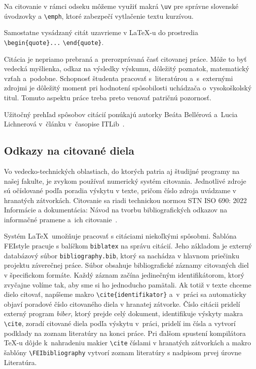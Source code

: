 Na citovanie v rámci odseku môžeme využiť makrá \verb|\uv| pre
správne slovenské úvodzovky a \verb|\emph|,
ktoré zabezpečí vytlačenie textu kurzívou.

Samostatne vysádzaný citát uzavrieme v \LaTeX-u do prostredia
\verb|\begin{quote}...| \verb|\end{quote}|.

Citácia je nepriamo prebraná a~prerozprávaná
časť citovanej práce.
Môže to byť vedecká myšlienka, odkaz na výsledky výskumu,
dôležitý poznatok, matematický vzťah a~podobne.
Schopnosť študenta pracovať s~literatúrou a~s~externými zdrojmi
je dôležitý moment pri hodnotení spôsobilosti uchádzača
o~vysokoškolský titul.
Tomuto aspektu práce treba preto venovať patričnú pozornosť.

Užitočný prehľad spôsobov citácií ponúkajú autorky
Beáta Bellérová a~Lucia Lichnerová v~článku v~časopise ITLib~\cite{Lichnerova2023Nove}.

\subsection{Odkazy na citované diela}
Vo vedecko-technických oblastiach, do ktorých patria aj študijné programy na našej fakulte, je zvykom používať numerický systém citovania. Jednotlivé zdroje sú očíslované podľa poradia výskytu v texte, pričom číslo zdroja uvádzame v hranatých zátvorkách.
Citovanie sa riadi technickou normou STN ISO 690: 2022 Informácie a dokumentácia: Návod na tvorbu bibliografických odkazov na informačné pramene a~ich citovanie~\cite{iso690}.

Systém \LaTeX\ umožňuje pracovať s citáciami niekoľkými spôsobmi.
Šablóna FEIstyle pracuje s balíčkom \verb|biblatex| na správu citácií. Jeho základom je externý databázový súbor \texttt{bibliography.bib},
ktorý sa nachádza v hlavnom priečinku projektu záverečnej práce.
Súbor obsahuje bibliografické záznamy citovaných diel
v špecifickom formáte.
Každý záznam začína jedinečným identifikátorom, ktorý zvyčajne
volíme tak, aby sme si ho jednoducho pamätali.
Ak totiž v texte chceme dielo citovať, napíšeme makro \verb|\cite{identifikator}| a~v~práci sa automaticky objaví poradové číslo citovaného diela v hranatej zátvorke.
Číslo citácii pridelí externý program \textsl{biber},
ktorý prejde celý dokument, identifikuje výskyty makra \verb|\cite|, zoradí citované diela podľa výskytu v~práci,
pridelí im čísla a vytvorí podklady na zoznam literatúry na konci práce.
Pri ďalšom spustení kompilátora \TeX-u dôjde k~nahradeniu makier
\verb|\cite| číslami v hranatých zátvorkách a makro šablóny
\verb|\FEIbibliography| vytvorí zoznam literatúry s nadpisom
prvej úrovne Literatúra.


